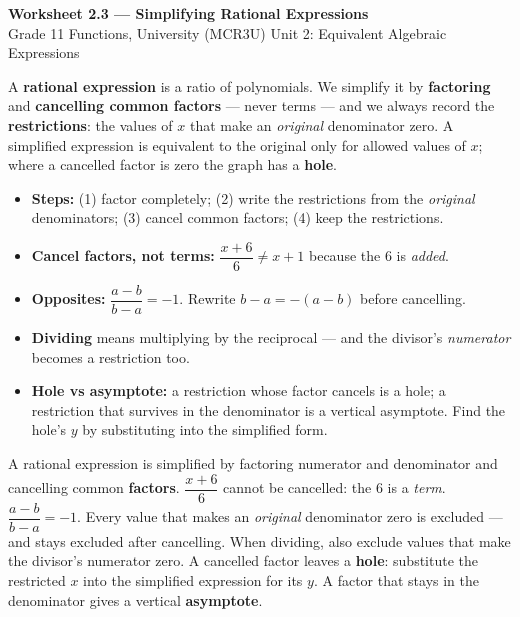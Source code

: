 \documentclass[11pt]{article}
\begin{document}
\begin{center}
{\LARGE\bfseries\color{titleblue}Worksheet 2.3 --- Simplifying Rational Expressions}\\[2pt]
{\small Grade 11 Functions, University (MCR3U) \textperiodcentered{} Unit 2: Equivalent Algebraic Expressions}
\end{center}

\begin{ideabox}
A \textbf{rational expression} is a ratio of polynomials. We simplify it by \textbf{factoring} and \textbf{cancelling common factors} --- never terms --- and we always record the \textbf{restrictions}: the values of $x$ that make an \emph{original} denominator zero. A simplified expression is equivalent to the original only for allowed values of $x$; where a cancelled factor is zero the graph has a \textbf{hole}.
\begin{itemize}[leftmargin=*,itemsep=2pt]
  \item \textbf{Steps:} (1) factor completely; (2) write the restrictions from the \emph{original} denominators; (3) cancel common factors; (4) keep the restrictions.
  \item \textbf{Cancel factors, not terms:} $\dfrac{x+6}{6}\ne x+1$ because the $6$ is \emph{added}.
  \item \textbf{Opposites:} $\dfrac{a-b}{b-a}=-1$. Rewrite $b-a=-(a-b)$ before cancelling.
  \item \textbf{Dividing} means multiplying by the reciprocal --- and the divisor's \emph{numerator} becomes a restriction too.
  \item \textbf{Hole vs asymptote:} a restriction whose factor cancels is a hole; a restriction that survives in the denominator is a vertical asymptote. Find the hole's $y$ by substituting into the simplified form.
\end{itemize}
\end{ideabox}

\begin{learnbox}
A rational expression is simplified by factoring numerator and denominator and cancelling common \textbf{factors}. $\dfrac{x+6}{6}$ cannot be cancelled: the $6$ is a \emph{term}. $\dfrac{a-b}{b-a}=-1$.
Every value that makes an \emph{original} denominator zero is excluded --- and stays excluded after cancelling. When dividing, also exclude values that make the divisor's numerator zero.
A cancelled factor leaves a \textbf{hole}: substitute the restricted $x$ into the simplified expression for its $y$. A factor that stays in the denominator gives a vertical \textbf{asymptote}.
\end{learnbox}
\end{document}
